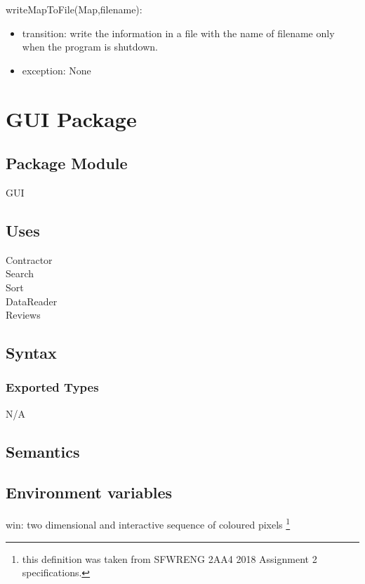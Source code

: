 \documentclass[12pt]{scrartcl}
\begin{document}
writeMapToFile(Map,filename):
\begin{itemize}
\item transition: write the information in a file with the name of filename only when the program is shutdown.
\item exception: None
\end{itemize}


\newpage

\section {GUI Package}

\subsection{Package Module}

GUI

\subsection {Uses}

Contractor \\
Search \\
Sort \\
DataReader \\
Reviews \\

\subsection {Syntax}

\subsubsection {Exported Types}

N/A

\subsection {Semantics}

\subsection{Environment variables}

win: two dimensional and interactive sequence of coloured pixels \footnote{this definition was taken from SFWRENG 2AA4 2018 Assignment 2 specifications.}
\end{document}
